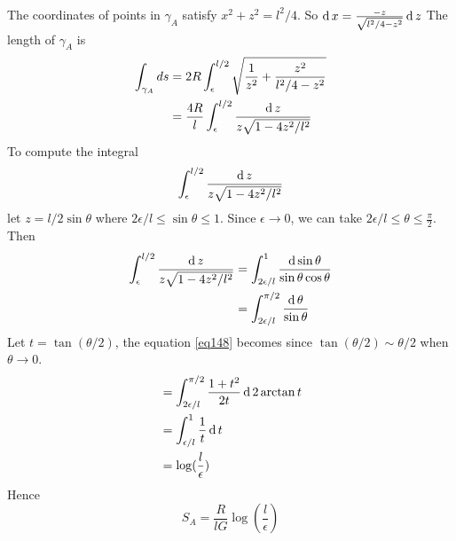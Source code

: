 \subsubsection{}
The coordinates of points in $\gamma_A$ satisfy $x^2 + z^2 = l^2/4$. So $\operatorname{d} x = \frac{-z}{\sqrt{l^2/4 - z^2}} \operatorname{d} z$
The length of $\gamma_A$ is 
\begin{equation}
	\begin{split}
	\int_{\gamma_A} ds & = 2 R\int_{\epsilon}^{l/2}  \sqrt{\frac{1}{z^2} + \frac{z^2}{l^2/4 -z^2}}\\
	& = \frac{4R}{l} \int_{\epsilon}^{l/2} \frac{\operatorname{d} z}{z \sqrt{1- 4z^2/l^2}}
	\end{split}
\end{equation}
To compute the integral
\[
\int_{\epsilon}^{l/2} \frac{\operatorname{d} z}{z \sqrt{1-4z^2/l^2}}
\]
let $z=l/2 \sin \theta$ where $2\epsilon/l \leq  \sin \theta \leq 1$. Since $\epsilon \to 0$, we can take $ 2 \epsilon/l \leq \theta \leq \frac{\pi}{2}$. Then
\begin{equation}
\label{eq148}
	\begin{split}
	\int_{\epsilon}^{l/2} \frac{\operatorname{d} z}{z \sqrt{1-4 z^2/l^2}} & = \int_{2\epsilon/l}^{1} \frac{\operatorname{d} \sin \theta}{\sin \theta \cos \theta}\\
	& = \int_{2\epsilon/l}^{\pi/2} \frac{\operatorname{d} \theta}{\sin \theta}
	\end{split}
\end{equation}
Let $t = \tan (\theta/2)$, the equation \ref{eq148} becomes since $\tan(\theta/2) \sim  \theta/2$ when $\theta \to 0$.
\begin{equation}
	\begin{split}
	&=\int_{2\epsilon/l}^{\pi/2} \frac{1+t^2}{2t} \operatorname{d} 2\arctan t\\
	&= \int_{\epsilon/l}^{1}\frac{1}{t} \operatorname{d} t\\
	& = \log (\frac{l}{\epsilon})
	\end{split}
\end{equation}
Hence 
\begin{equation}
	S_A = \frac{R}{lG} \log \left( \frac{l}{\epsilon} \right)
\end{equation}